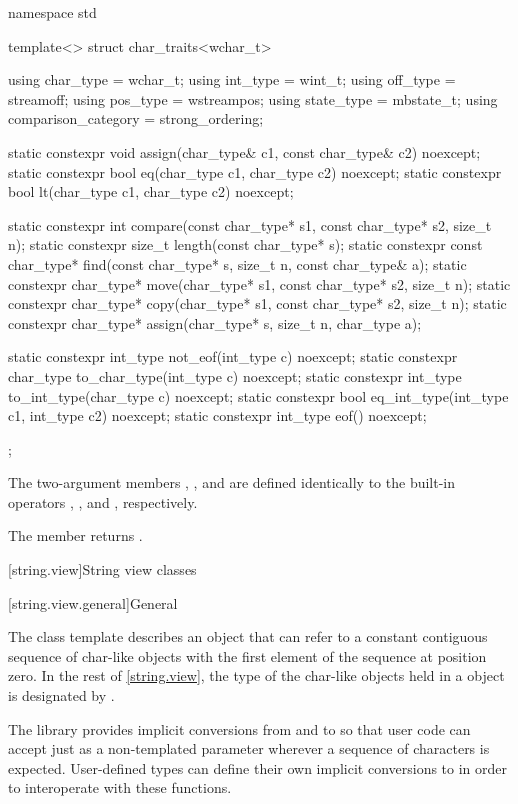 %
\begin{codeblock}
namespace std {
  template<> struct char_traits<wchar_t> {
    using char_type  = wchar_t;
    using int_type   = wint_t;
    using off_type   = streamoff;
    using pos_type   = wstreampos;
    using state_type = mbstate_t;
    using comparison_category = strong_ordering;

    static constexpr void assign(char_type& c1, const char_type& c2) noexcept;
    static constexpr bool eq(char_type c1, char_type c2) noexcept;
    static constexpr bool lt(char_type c1, char_type c2) noexcept;

    static constexpr int compare(const char_type* s1, const char_type* s2, size_t n);
    static constexpr size_t length(const char_type* s);
    static constexpr const char_type* find(const char_type* s, size_t n,
                                           const char_type& a);
    static constexpr char_type* move(char_type* s1, const char_type* s2, size_t n);
    static constexpr char_type* copy(char_type* s1, const char_type* s2, size_t n);
    static constexpr char_type* assign(char_type* s, size_t n, char_type a);

    static constexpr int_type not_eof(int_type c) noexcept;
    static constexpr char_type to_char_type(int_type c) noexcept;
    static constexpr int_type to_int_type(char_type c) noexcept;
    static constexpr bool eq_int_type(int_type c1, int_type c2) noexcept;
    static constexpr int_type eof() noexcept;
  };
}
\end{codeblock}


\pnum
The two-argument members
,
,
and
are defined identically
to the built-in operators
\tcode{=},
\tcode{==},
and
\tcode{<},
respectively.

\pnum
The member
returns
.

[string.view]{String view classes}

[string.view.general]{General}

\pnum
The class template  describes an object that can refer to a constant contiguous sequence of char-like objects with the first element of the sequence at position zero.
In the rest of \ref{string.view}, the type of the char-like objects held in a  object is designated by .

\pnum
\begin{note}
The library provides implicit conversions from  and  to  so that user code can accept just  as a non-templated parameter wherever a sequence of characters is expected.
User-defined types can define their own implicit conversions to  in order to interoperate with these functions.
\end{note}

